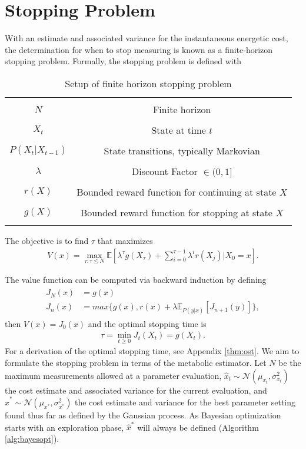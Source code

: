 \section{Stopping Problem}
With an estimate and associated variance for the instantaneous energetic cost, the determination for when to stop measuring is known as a finite-horizon stopping problem. Formally, the stopping problem is defined with

\begin{table}[h]
\centering
\begin{tabular}{ |c  c| }
  \hline&\\
  $N$ & Finite horizon\\
  &\\
  $X_t$ & State at time $t$\\
  &\\
  $P(X_t \vert X_{t-1})$ & State transitions, typically Markovian\\
  &\\
  $\lambda$ & Discount Factor $\in (0, 1]$\\
  &\\
  $r(X)$ & Bounded reward function for continuing at state $X$\\
  &\\
  $g(X)$ & Bounded reward function for stopping at state $X$\\
  &\\
  \hline
\end{tabular}
\caption{Setup of finite horizon stopping problem}
\label{tab:stopping}
\end{table}

The objective is to find $\tau$ that maximizes
\begin{align}
  V(x) = \max_{\tau: \tau \leq N} \mathbb{E}[\lambda^{\tau} g(X_{\tau}) + \sum_{i=0}^{\tau-1} \lambda^{i}r(X_j) \vert X_0 = x].
\end{align}

The value function can be computed via backward induction by defining
\begin{align}
\begin{split}
  J_N(x) &= g(x)\\
  J_n(x) &= max\{g(x), r(x) + \lambda\mathbb{E}_{P(y\vert x)}[J_{n+1}(y)]\},
\end{split}
\end{align}
then $V(x) = J_0(x)$ and the optimal stopping time is
\begin{align}
  \tau = \min_{t \geq 0}J_t(X_t) = g(X_t).
\end{align}
For a derivation of the optimal stopping time, see Appendix \ref{thm:ost}. We aim to formulate the stopping problem in terms of the metabolic estimator. Let $N$ be the maximum measurements allowed at a parameter evaluation, $\hat{x}_t \sim \mathcal{N}(\mu_{x_t}, \sigma^2_{x_t})$ the cost estimate and associated variance for the current evaluation, and $\hat{x}^* \sim \mathcal{N}(\mu_{x^*}, \sigma^2_{x^*})$ the cost estimate and variance for the best parameter setting found thus far as defined by the Gaussian process. As Bayesian optimization starts with an exploration phase, $\hat{x}^*$ will always be defined (Algorithm \ref{alg:bayesopt}).

